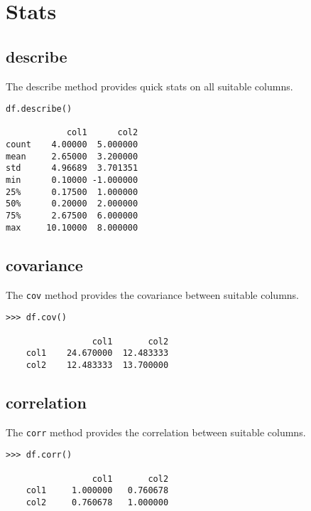 
\section{Stats}



\subsection{describe}

The describe method provides quick stats on all suitable columns.

\begin{framed}
\begin{verbatim}
df.describe()

            col1      col2
count    4.00000  5.000000
mean     2.65000  3.200000
std      4.96689  3.701351
min      0.10000 -1.000000
25%      0.17500  1.000000
50%      0.20000  2.000000
75%      2.67500  6.000000
max     10.10000  8.000000
\end{verbatim}
\end{framed}

\subsection{covariance}

The \texttt{cov} method provides the covariance between suitable columns.


\begin{framed}
\begin{verbatim}
>>> df.cov()

                 col1       col2
    col1    24.670000  12.483333
    col2    12.483333  13.700000
\end{verbatim}
\end{framed}


\subsection{correlation}

The \texttt{corr} method provides the correlation between suitable columns.
\begin{framed}
 \begin{verbatim}
>>> df.corr()
  
                 col1       col2
    col1     1.000000   0.760678
    col2     0.760678   1.000000
\end{verbatim}
\end{framed}


